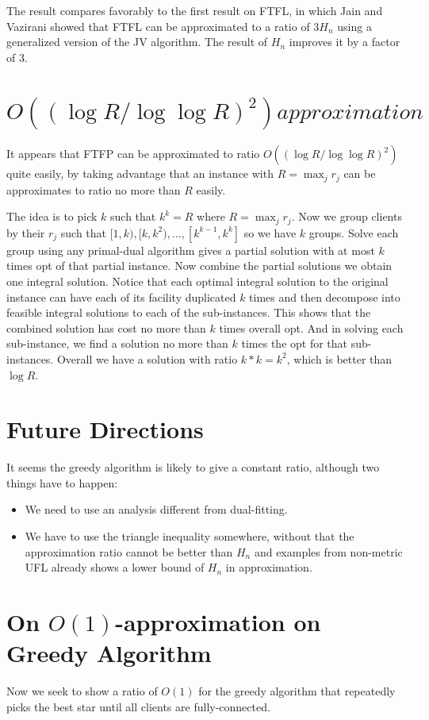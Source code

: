 \documentclass{article}[11pt]
\begin{document}
The result compares favorably to the first result on FTFL, in which
Jain and Vazirani showed that FTFL can be approximated to a ratio of
$3H_n$ using a generalized version of the JV algorithm. The result of
$H_n$ improves it by a factor of $3$.

\section{$O((\log R/\log\log R)^2) approximation$}
It appears that FTFP can be approximated to ratio $O((\log R / \log\log
R)^2)$ quite easily, by taking advantage that an instance with $R =
\max_j r_j$ can be approximates to ratio no more than $R$ easily.

The idea is to pick $k$ such that $k^k = R$ where $R = \max_j
r_j$. Now we group clients by their $r_j$ such that $[1,k), [k,k^2),
\ldots, [k^{k-1}, k^k]$ so we have $k$ groups. Solve each group using
any primal-dual algorithm gives a partial solution with at most $k$
times opt of that partial instance. Now combine the partial solutions
we obtain one integral solution. Notice that each optimal integral
solution to the original instance can have each of its facility
duplicated $k$ times and then decompose into feasible integral
solutions to each of the sub-instances. This shows that the combined
solution has cost no more than $k$ times overall opt. And in solving
each sub-instance, we find a solution no more than $k$ times the opt
for that sub-instances. Overall we have a solution with ratio $k*k =
k^2$, which is better than $\log R$.

\section{Future Directions}
It seems the greedy algorithm is likely to give a constant ratio,
although two things have to happen:
\begin{itemize}
\item We need to use an analysis different from dual-fitting.
\item We have to use the triangle inequality somewhere, without that
  the approximation ratio cannot be better than $H_n$ and examples
  from non-metric UFL already shows a lower bound of $H_n$ in approximation.
\end{itemize}

\section{On $O(1)$-approximation on Greedy Algorithm}
Now we seek to show a ratio of $O(1)$ for the greedy algorithm that
repeatedly picks the best star until all clients are fully-connected.
\end{document}
